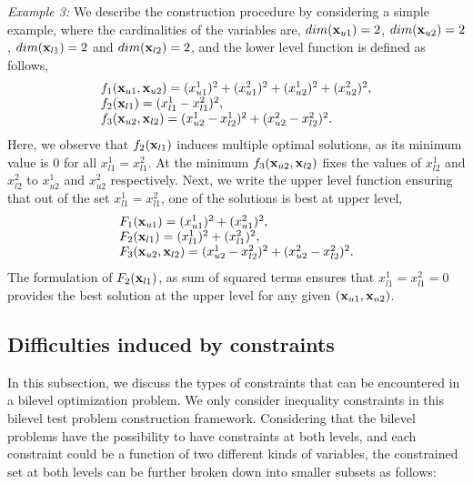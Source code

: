\documentclass[twoside]{article}
\begin{document}
\vskip 0.2cm
\textit{Example 3:} We describe the construction procedure by considering a simple example, where the cardinalities of the variables are, $dim(\mbox{$\mathbf{x}$}_{u1}) = 2$, $dim(\mbox{$\mathbf{x}$}_{u2}) = 2$, $dim(\mbox{$\mathbf{x}$}_{l1}) = 2$ and $dim(\mbox{$\mathbf{x}$}_{l2}) = 2$, and the lower level function is defined as follows,
\begin{equation}
\begin{array}{l}
f_1(\mbox{$\mathbf{x}$}_{u1}, \mbox{$\mathbf{x}$}_{u2}) = (x_{u1}^{1})^2 + (x_{u1}^{2})^2 + (x_{u2}^{1})^2 + (x_{u2}^{2})^2,\\
f_2(\mbox{$\mathbf{x}$}_{l1}) =   (x_{l1}^{1} - x_{l1}^{2})^2,\\
f_3(\mbox{$\mathbf{x}$}_{u2},\mbox{$\mathbf{x}$}_{l2}) =  (x_{u2}^{1} - x_{l2}^{1})^2 +  (x_{u2}^{2} - x_{l2}^{2})^2.\\
\end{array}
\end{equation}
Here, we observe that $f_2(\mbox{$\mathbf{x}$}_{l1})$ induces multiple optimal solutions, as its minimum value is $0$ for all $x_{l1}^{1} = x_{l1}^{2}$. At the minimum $f_3(\mbox{$\mathbf{x}$}_{u2},\mbox{$\mathbf{x}$}_{l2})$ fixes the values of $x_{l2}^{1}$ and $x_{l2}^{2}$ to $x_{u2}^{1}$ and $x_{u2}^{2}$ respectively. Next, we write the upper level function ensuring that out of the set $x_{l1}^{1} = x_{l1}^{2}$, one of the solutions is best at upper level,
\begin{equation}
\begin{array}{l}
F_1(\mbox{$\mathbf{x}$}_{u1}) = (x_{u1}^{1})^2 + (x_{u1}^{2})^2,\\
F_2(\mbox{$\mathbf{x}$}_{l1}) =   (x_{l1}^{1})^2 + (x_{l1}^{2})^2,\\
F_3(\mbox{$\mathbf{x}$}_{u2},\mbox{$\mathbf{x}$}_{l2}) =  (x_{u2}^{1} - x_{l2}^{2})^2 +  (x_{u2}^{2} - x_{l2}^{2})^2.\\
\end{array}
\end{equation}
The formulation of $F_2(\mbox{$\mathbf{x}$}_{l1})$, as sum of squared terms ensures that $x_{l1}^{1} = x_{l1}^{2} = 0$ provides the best solution at the upper level for any given $(\mbox{$\mathbf{x}$}_{u1},\mbox{$\mathbf{x}$}_{u2})$.

\subsection{Difficulties induced by constraints}
In this subsection, we discuss the types of constraints that can be encountered in a bilevel optimization problem. We only consider inequality constraints in this bilevel test problem construction framework. Considering that the bilevel problems have the possibility to have constraints at both levels, and each constraint could be a function of two different kinds of variables, the constrained set at both levels can be further broken down into smaller subsets as follows:
\end{document}
